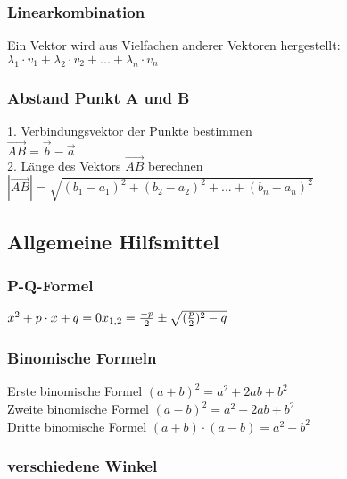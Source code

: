 \documentclass[6pt,a4paper]{scrartcl}
\newcommand{\abs}[1]{\ensuremath{\left\vert#1\right\vert}}
\begin{document}
\begin{multicols*}{3}
\subsubsection{Linearkombination}
Ein Vektor wird aus Vielfachen anderer Vektoren hergestellt:\\
${\lambda}_{1}\cdot v_1 + {\lambda}_{2}\cdot v_2 + ... + {\lambda}_{n} \cdot v_n$

\subsubsection{Abstand Punkt A und B}
1. Verbindungsvektor der Punkte bestimmen\\
$\overrightarrow{AB} = \overrightarrow{b} - \overrightarrow{a}$
\\
2. Länge des Vektors $\overrightarrow{AB}$ berechnen\\
$\abs{\overrightarrow{AB}} = \sqrt{(b_1-a_1)^2 + (b_2-a_2)^2 + ... + (b_n-a_n)^2}$\\
\subsection{Allgemeine Hilfsmittel}
\subsubsection{P-Q-Formel}
$
x^2 + p\cdot x + q = 0\\
{x}_{1,2} = \frac{-p}{2} \pm \sqrt{(\frac{p}{2})^2 - q}
$
\subsubsection{Binomische Formeln}
Erste binomische Formel $(a+b)^{2}=a^{2} + 2ab + b^{2}$ \\
Zweite binomische Formel $(a-b)^{2}=a^{2} - 2ab + b^{2}$ \\
Dritte binomische Formel $(a+b)\cdot (a-b)=a^{2}-b^{2}$ \\

\subsubsection{verschiedene Winkel}



\end{multicols*}


\end{document}
